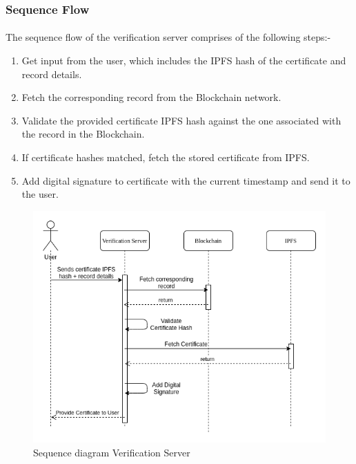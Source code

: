 \documentclass{article}
\begin{document}
        \subsubsection{Sequence Flow}
        \paragraph{}
        The sequence flow of the verification server comprises of the following steps:-
        \begin{enumerate}
            \item Get input from the user, which includes the IPFS hash of the certificate and record details.
            \item Fetch the corresponding record from the Blockchain network.
            \item Validate the provided certificate IPFS hash against the one associated with the record in the Blockchain.
            \item If certificate hashes matched, fetch the stored certificate from IPFS.
            \item Add digital signature to certificate with the current timestamp and send it to the user.
        \end{enumerate}
        
        \begin{figure}[H]
                \includegraphics[scale=0.5]{verification_seq.png}
                \centering
                \caption{Sequence diagram Verification Server}
        \end{figure}
        
\end{document}
